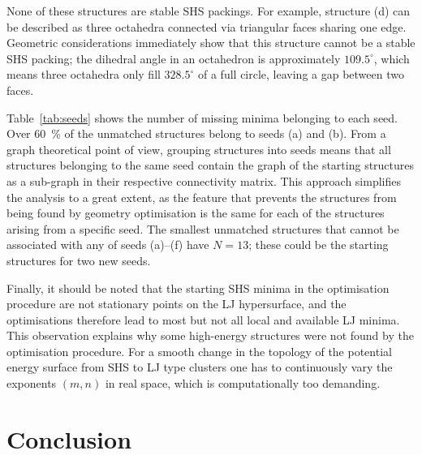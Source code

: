 %
None of these structures are stable \ac{SHS} packings. For example, structure
(d) can be described as three octahedra connected via triangular faces sharing
one edge. Geometric
considerations\autocite{Arkus_DerivingFiniteSphere_2011,Hoy_Structurefinitesphere_2012}
immediately show that this structure cannot be a stable \ac{SHS} packing; the
dihedral angle in an octahedron is approximately $109.5^\circ$, which means
three octahedra only fill $328.5^\circ$ of a full circle, leaving a gap between
two faces. 

Table~\ref{tab:seeds} shows the number of missing minima belonging to each seed.
Over 60~\% of the unmatched structures belong to seeds (a) and (b). From a graph
theoretical point of
view,\autocite{Arkus_Minimalenergyclusters_2009,Arkus_DerivingFiniteSphere_2011}
grouping structures into seeds means that all structures belonging to the same
seed contain the graph of the starting structures as a sub-graph in their
respective connectivity matrix. This approach simplifies the analysis to a great
extent, as the feature that prevents the structures from being found by geometry
optimisation is the same for each of the structures arising from a specific
seed. The smallest unmatched structures that cannot be associated with any of
seeds (a)--(f) have $N=13$; these could be the starting structures for two new
seeds.

Finally, it should be noted that the starting \ac{SHS} minima in the
optimisation procedure are not stationary points on the \ac{LJ} hypersurface,
and the optimisations therefore lead to most but not all local and available
\ac{LJ} minima. This observation explains why some high-energy structures were
not found by the optimisation procedure. For a smooth change in the topology of
the potential energy surface from \ac{SHS} to \ac{LJ} type clusters one has to
continuously vary the exponents $(m,n)$ in real space, which is computationally
too demanding.

\section{Conclusion}

